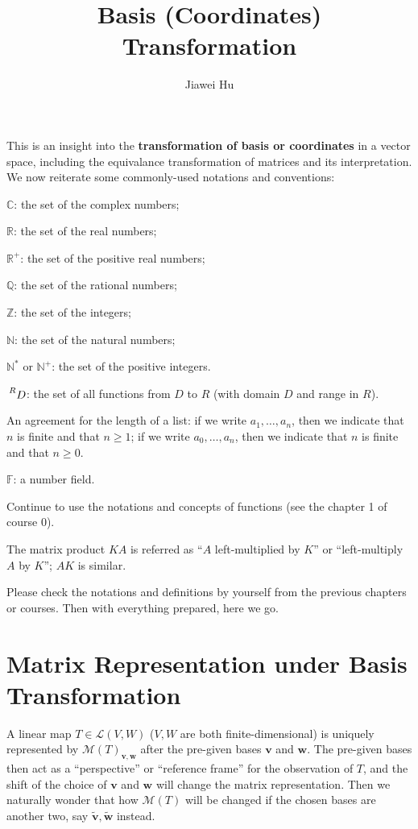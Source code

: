 \documentclass{article}
\title{\LARGE \textbf{Basis (Coordinates) Transformation}}
\author{\large Jiawei Hu}
\newcommand{\basisTilde}[1]{\tilde{\pmb{#1}}}
\begin{document}
\maketitle
\tableofcontents
\newpage

This is an insight into the \textbf{transformation of basis or coordinates} in a vector space, including the equivalance transformation of matrices and its interpretation.
We now reiterate some commonly-used notations and conventions:
\begin{compactenum}
    \item $\mathbb{C}$: the set of the complex numbers;
    \item $\mathbb{R}$: the set of the real numbers;
    \item $\mathbb{R}^+$: the set of the positive real numbers;
    \item $\mathbb{Q}$: the set of the rational numbers;
    \item $\mathbb{Z}$: the set of the integers;
    \item $\mathbb{N}$: the set of the natural numbers;
    \item $\mathbb{N^\ast}$ or $\mathbb{N}^+$: the set of the positive integers.
    \item $\sideset{^R}{}{\mathop{D}}$: the set of all functions from $D$ to $R$ (with domain $D$ and range in $R$).
    \item An agreement for the length of a list: if we write $a_1, \dots, a_n$, then we indicate that $n$ is finite and that $n\geq 1$; if we write $a_0, \dots, a_n$, then we indicate that $n$ is finite and that $n\geq 0$.
    \item $\mathbb{F}$: a number field.
    \item Continue to use the notations and concepts of functions (see the chapter 1 of course 0).
    \item The matrix product $KA$ is referred as ``$A$ left-multiplied by $K$'' or ``left-multiply $A$ by $K$''; $AK$ is similar.
\end{compactenum} 
Please check the notations and definitions by yourself from the previous chapters or courses. Then with everything prepared, here we go.

\section{Matrix Representation under Basis Transformation}
A linear map $T\in\mathcal{L}(V,W)$ ($V, W$ are both finite-dimensional) is uniquely represented by $\mathcal{M}(T)_{\pmb{v}, \pmb{w}}$ after the pre-given bases $\pmb{v}$ and $\pmb{w}$. The pre-given bases then act as a ``perspective'' or ``reference frame'' for the observation of $T$, and the shift of the choice of $\pmb{v}$ and $\pmb{w}$ will change the matrix representation. Then we naturally wonder that how $\mathcal{M}(T)$ will be changed if the chosen bases are another two, say $\basisTilde{v}, \basisTilde{w}$ instead.
\end{document}
